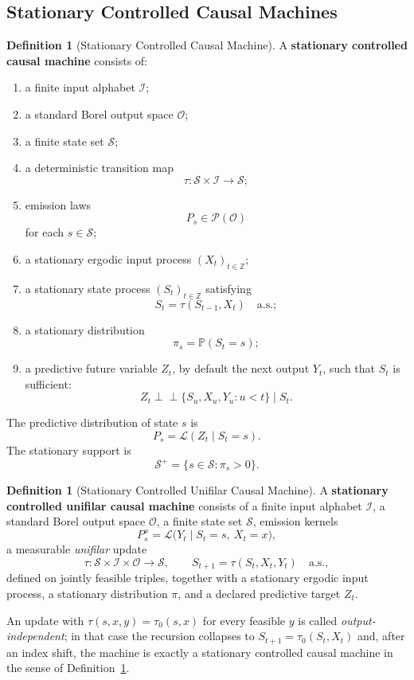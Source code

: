 \documentclass[12pt]{article}
\theoremstyle{definition}
\newtheorem{definition}[theorem]{Definition}
\newcommand{\Splus}{\mathcal S^{+}}
\begin{document}
\subsection{Stationary Controlled Causal Machines}
\label{subsec:controlled-markov}

\begin{definition}[Stationary Controlled Causal Machine]
\label{def:controlled-markov}
A \textbf{stationary controlled causal machine} consists of:
\begin{enumerate}[label=(\arabic*)]
\item a finite input alphabet $\mathcal I$;
\item a standard Borel output space $\mathcal O$;
\item a finite state set $\mathcal S$;
\item a deterministic transition map
\[
\tau:\mathcal S\times\mathcal I\to\mathcal S;
\]
\item emission laws
\[
P_s\in\mathcal P(\mathcal O)
\]
for each $s\in\mathcal S$;
\item a stationary ergodic input process $(X_t)_{t\in\mathbb Z}$;
\item a stationary state process $(S_t)_{t\in\mathbb Z}$ satisfying
\[
S_t=\tau(S_{t-1},X_t)
\quad\text{a.s.};
\]
\item a stationary distribution
\[
\pi_s=\mathbb P(S_t=s);
\]
\item a predictive future variable $Z_t$, by default the next output $Y_t$,
such that $S_t$ is sufficient:
\[
Z_t\perp\!\!\!\perp
\{S_u,X_u,Y_u:u<t\}
\mid S_t.
\]
\end{enumerate}
The predictive distribution of state $s$ is
\[
P_s=\mathcal L(Z_t\mid S_t=s).
\]
The stationary support is
\[
\Splus=\{s\in\mathcal S:\pi_s>0\}.
\]
\end{definition}

\begin{definition}[Stationary Controlled Unifilar Causal Machine]
\label{def:unifilar-machine}
A \textbf{stationary controlled unifilar causal machine} consists of a finite
input alphabet $\mathcal I$, a standard Borel output space $\mathcal O$, a
finite state set $\mathcal S$, emission kernels
\[
P_s^x=\mathcal L\bigl(Y_t\mid S_t=s,\ X_t=x\bigr),
\]
a measurable \emph{unifilar} update
\[
\tau:\mathcal S\times\mathcal I\times\mathcal O\to\mathcal S,
\qquad
S_{t+1}=\tau(S_t,X_t,Y_t)\quad\text{a.s.},
\]
defined on jointly feasible triples, together with a stationary ergodic input
process, a stationary distribution $\pi$, and a declared predictive target
$Z_t$.

An update with $\tau(s,x,y)=\tau_0(s,x)$ for every feasible $y$ is called
\emph{output-independent}; in that case the recursion collapses to
$S_{t+1}=\tau_0(S_t,X_t)$ and, after an index shift, the machine is exactly a
stationary controlled causal machine in the sense of
Definition~\ref{def:controlled-markov}.
\end{definition}
\end{document}
